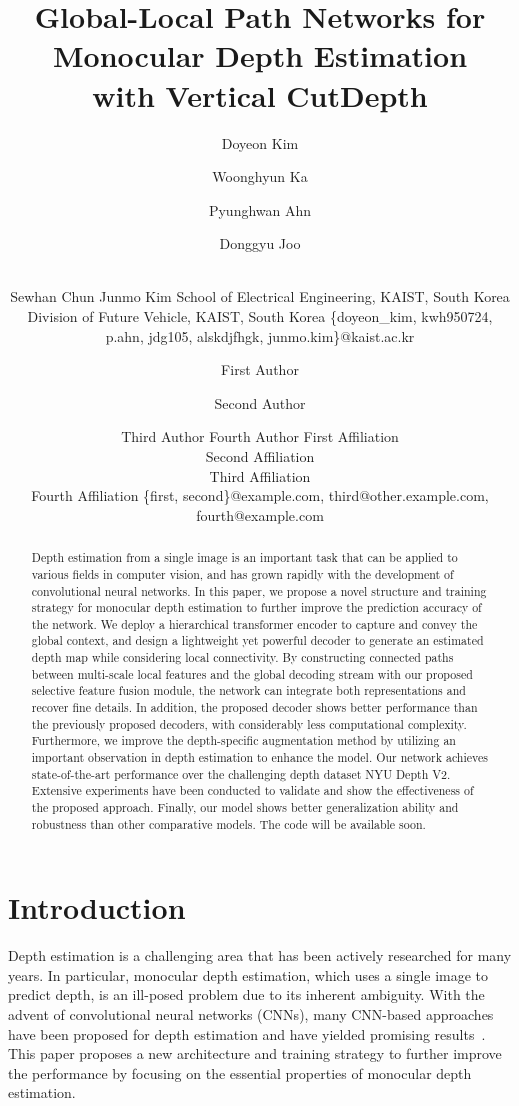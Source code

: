\documentclass{article}
\title{Global-Local Path Networks for Monocular Depth Estimation \\  with Vertical CutDepth}
\author{
Doyeon Kim\and
Woonghyun Ka\and
Pyunghwan Ahn\and
Donggyu Joo\and \\
Sewhan Chun\And
Junmo Kim
\affiliations
School of Electrical Engineering, KAIST, South Korea \\
Division of Future Vehicle, KAIST, South Korea 
\emails
\{doyeon\_kim, kwh950724, p.ahn, jdg105, alskdjfhgk, junmo.kim\}@kaist.ac.kr
}
\author{
First Author
\and
Second Author\and
Third Author\And
Fourth Author
\affiliations
First Affiliation\\
Second Affiliation\\
Third Affiliation\\
Fourth Affiliation
\emails
\{first, second\}@example.com,
third@other.example.com,
fourth@example.com
}
\makeatletter
\let\@internalcite\cite
\def\cite{\def\citeauthoryear##1##2{##1, ##2}\@internalcite}
\makeatother
\begin{document}
\maketitle

\begin{abstract}
    Depth estimation from a single image is an important task that can be applied to various fields in computer vision, and has grown rapidly with the development of convolutional neural networks. 
    In this paper, we propose a novel structure and training strategy for monocular depth estimation to further improve the prediction accuracy of the network. 
    We deploy a hierarchical transformer encoder to capture and convey the global context, and design a lightweight yet powerful decoder to generate an estimated depth map while considering local connectivity. 
    By constructing connected paths between multi-scale local features and the global decoding stream with our proposed selective feature fusion module, the network can integrate both representations and recover fine details. 
    In addition, the proposed decoder shows better performance than the previously proposed decoders,  with considerably less computational complexity. 
    Furthermore, we improve the depth-specific augmentation method by utilizing an important observation in depth estimation to enhance the model. 
    Our network achieves state-of-the-art performance over the challenging depth dataset NYU Depth V2. Extensive experiments have been conducted to validate and show the effectiveness of the proposed approach. Finally, our model shows better generalization ability and robustness than other comparative models. 
    The code will be available soon.
\end{abstract}

\section{Introduction}

Depth estimation is a challenging area that has been actively researched for many years. In particular, monocular depth estimation, which uses a single image to predict depth, is an ill-posed problem due to its inherent ambiguity. With the advent of convolutional neural networks (CNNs), many CNN-based approaches have been proposed for depth estimation and have yielded promising results~\cite{bhat2021adabins,lee2019big,fu2018deep}.
This paper proposes a new architecture and training strategy to further improve the performance by focusing on the essential properties of monocular depth estimation.
\end{document}
